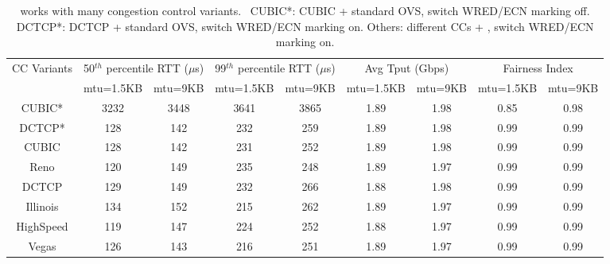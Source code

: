 \begin{table}[!t]
\tiny
\begin{center}
\begin{tabular}{ |c|c|c|c|c|c|c|c|c| }
 \hline
 \multirow{2}{*}{CC Variants} & \multicolumn{2}{|c|}{50$^{th}$ percentile RTT ($\mu$s)} & \multicolumn{2}{|c|}{99$^{th}$ percentile RTT ($\mu$s)} & \multicolumn{2}{|c|}{Avg Tput (Gbps)} & \multicolumn{2}{|c|}{Fairness Index}\\
 \cline{2-9}
       &  mtu=1.5KB & mtu=9KB & mtu=1.5KB & mtu=9KB & mtu=1.5KB & mtu=9KB & mtu=1.5KB & mtu=9KB\\
 \hline
 \hline
 CUBIC* &  3232     &   3448    &   3641     &  3865     &   1.89    & 1.98   &  0.85   &   0.98\\
 DCTCP* &  128      &   142    &   232    &   259    &   1.89    &   1.98  &  0.99    &   0.99\\
 \hline
 \hline
 CUBIC &   128     &   142    &    231    &   252    &   1.89    &  1.98   &  0.99    &  0.99 \\
 Reno  &   120     &   149    &    235    &   248    &   1.89    &  1.97   &  0.99    &  0.99 \\
DCTCP  &   129     &   149    &    232    &   266    &   1.88    &  1.98   &  0.99    &  0.99 \\
Illinois  &   134     &   152    &    215    &  262     &   1.89    &  1.97   &  0.99    &  0.99 \\
HighSpeed  &   119     &  147     &    224    &  252     &   1.88    & 1.97    &  0.99    & 0.99  \\
 Vegas  &   126     &   143    &    216    &    251   &   1.89    &  1.97   &  0.99    &  0.99 \\

 \hline

\end{tabular}
\caption{\acdc{} works with many congestion control variants.~
        CUBIC*: CUBIC + standard OVS, switch WRED/ECN marking off.
        DCTCP*: DCTCP + standard OVS, switch WRED/ECN marking on.
        Others: different CCs + \acdc{}, switch WRED/ECN marking on.}
\label{other_cc_variants}
\end{center}
\end{table}

